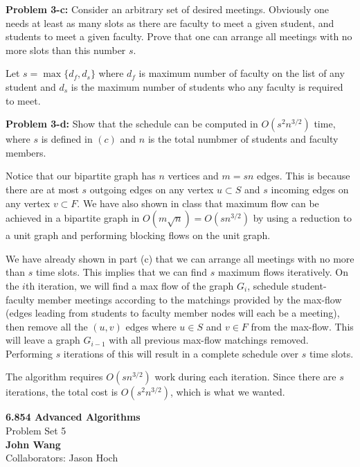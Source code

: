 \documentclass[psamsfonts]{amsart}
\newenvironment{sol}{\vspace{0.25cm}{\large \bfseries Solution:}}{\qedsymbol}
\newenvironment{prob}[1]{\begin{framed}{\large \bfseries Problem #1:}}{\end{framed}}
\newcommand{\makenewtitle}{
    \begin{center}
    {\huge \bfseries 6.854 Advanced Algorithms} \\
    Problem Set 5\\
    \vspace{0.25cm}
    {\bfseries John Wang} \\
    Collaborators: Jason Hoch
    \end{center}
    \vspace{0.5cm}
}
\begin{document}
\begin{prob}{3-c}
Consider an arbitrary set of desired meetings. Obviously one needs at least as many slots as there are faculty to meet a given student, and students to meet a given faculty. Prove that one can arrange all meetings with no more slots than this number $s$.
\end{prob}
\begin{sol}
Let $s = \max\{d_{f}, d_s\}$ where $d_f$ is maximum number of faculty on the list of any student and $d_s$ is the maximum number of students who any faculty is required to meet.
\end{sol}

\begin{prob}{3-d}
Show that the schedule can be computed in $O(s^2 n^{3/2})$ time, where $s$ is defined in $(c)$ and $n$ is the total numbmer of students and faculty members.
\end{prob}
\begin{sol}
Notice that our bipartite graph has $n$ vertices and $m = sn$ edges. This is because there are at most $s$ outgoing edges on any vertex $u \subset S$ and $s$ incoming edges on any vertex $v \subset F$. We have also shown in class that maximum flow can be achieved in a bipartite graph in $O(m \sqrt{n}) = O(s n^{3/2})$ by using a reduction to a unit graph and performing blocking flows on the unit graph. 

We have already shown in part (c) that we can arrange all meetings with no more than $s$ time slots. This implies that we can find $s$ maximum flows iteratively. On the $i$th iteration, we will find a max flow of the graph $G_i$, schedule student-faculty member meetings according to the matchings provided by the max-flow (edges leading from students to faculty member nodes will each be a meeting), then remove all the $(u,v)$ edges where $u \in S$ and $v \in F$ from the max-flow. This will leave a graph $G_{i-1}$ with all previous max-flow matchings removed. Performing $s$ iterations of this will result in a complete schedule over $s$ time slots.

The algorithm requires $O(s n^{3/2})$ work during each iteration. Since there are $s$ iterations, the total cost is $O(s^2 n^{3/2})$, which is what we wanted.
\end{sol}

\newpage
\makenewtitle
\end{document}
